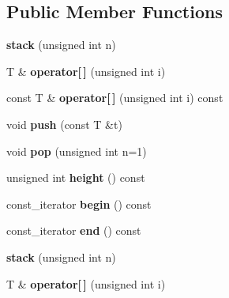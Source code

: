 \subsection*{Public Member Functions}
\begin{DoxyCompactItemize}
\item 
\hypertarget{classyy_1_1stack_af4277ae80177abc36f242c3646cbcfbe}{{\bfseries stack} (unsigned int n)}\label{classyy_1_1stack_af4277ae80177abc36f242c3646cbcfbe}

\item 
\hypertarget{classyy_1_1stack_a1058b8b7e1a3e0aa7b1e6f2f1a62c234}{T \& {\bfseries operator\mbox{[}$\,$\mbox{]}} (unsigned int i)}\label{classyy_1_1stack_a1058b8b7e1a3e0aa7b1e6f2f1a62c234}

\item 
\hypertarget{classyy_1_1stack_a46778e0ee1fd32a559008d5a261df098}{const T \& {\bfseries operator\mbox{[}$\,$\mbox{]}} (unsigned int i) const }\label{classyy_1_1stack_a46778e0ee1fd32a559008d5a261df098}

\item 
\hypertarget{classyy_1_1stack_a5ff563955472eca36f73f6e840df2963}{void {\bfseries push} (const T \&t)}\label{classyy_1_1stack_a5ff563955472eca36f73f6e840df2963}

\item 
\hypertarget{classyy_1_1stack_a0800c0a796cade80c3ce9a785dc87564}{void {\bfseries pop} (unsigned int n=1)}\label{classyy_1_1stack_a0800c0a796cade80c3ce9a785dc87564}

\item 
\hypertarget{classyy_1_1stack_a968303842836fd4e9e3994a4e3984191}{unsigned int {\bfseries height} () const }\label{classyy_1_1stack_a968303842836fd4e9e3994a4e3984191}

\item 
\hypertarget{classyy_1_1stack_a3939df081955a4ad78e14eeb9b2b5dbf}{const\-\_\-iterator {\bfseries begin} () const }\label{classyy_1_1stack_a3939df081955a4ad78e14eeb9b2b5dbf}

\item 
\hypertarget{classyy_1_1stack_a27ade5b933a4dc8a27960c88addda2a0}{const\-\_\-iterator {\bfseries end} () const }\label{classyy_1_1stack_a27ade5b933a4dc8a27960c88addda2a0}

\item 
\hypertarget{classyy_1_1stack_af4277ae80177abc36f242c3646cbcfbe}{{\bfseries stack} (unsigned int n)}\label{classyy_1_1stack_af4277ae80177abc36f242c3646cbcfbe}

\item 
\hypertarget{classyy_1_1stack_a1058b8b7e1a3e0aa7b1e6f2f1a62c234}{T \& {\bfseries operator\mbox{[}$\,$\mbox{]}} (unsigned int i)}\label{classyy_1_1stack_a1058b8b7e1a3e0aa7b1e6f2f1a62c234}


\end{DoxyCompactItemize}

